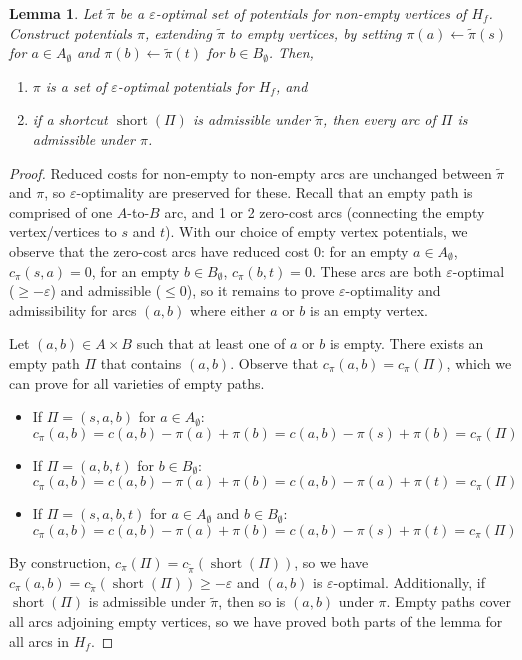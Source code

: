 \documentclass[11pt]{article}
\def\eps{\varepsilon}
\theoremstyle{plain}
\newtheorem{lemma}{Lemma}[section]
\numberwithin{figure}{section}
\def\short{\operatorname{short}}
\begin{document}
\begin{lemma}
\label{lemma:empty_correct}
Let $\tilde{\pi}$ be a $\eps$-optimal set of potentials for non-empty
vertices of $H_f$.
Construct potentials $\pi$, extending $\tilde{\pi}$ to empty vertices, by
setting $\pi(a) \gets \tilde{\pi}(s)$ for $a \in A_\emptyset$ and
$\pi(b) \gets \tilde{\pi}(t)$ for $b \in B_\emptyset$.
Then,
\begin{enumerate}
\item $\pi$ is a set of $\eps$-optimal potentials for $H_f$, and
\item if a shortcut $\short(\Pi)$ is admissible under $\tilde{\pi}$,
	then every arc of $\Pi$ is admissible under $\pi$.
\end{enumerate}
\end{lemma}

\begin{proof}
Reduced costs for non-empty to non-empty arcs are unchanged between
$\tilde{\pi}$ and $\pi$, so $\eps$-optimality are preserved for these.
Recall that an empty path is comprised of one $A$-to-$B$ arc, and 1 or 2
zero-cost arcs (connecting the empty vertex/vertices to $s$ and $t$).
With our choice of empty vertex potentials, we observe that the zero-cost arcs
have reduced cost 0:
for an empty $a \in A_\emptyset$, $c_\pi(s, a) = 0$, for an empty
$b \in B_\emptyset$, $c_\pi(b, t) = 0$.
These arcs are both $\eps$-optimal ($\geq -\eps$) and admissible ($\leq 0$), so
it remains to prove $\eps$-optimality and admissibility for arcs $(a, b)$ where
either $a$ or $b$ is an empty vertex.

Let $(a, b) \in A \times B$ such that at least one of $a$ or $b$ is empty.
There exists an empty path $\Pi$ that contains $(a, b)$.
Observe that $c_\pi(a, b) = c_\pi(\Pi)$,
which we can prove for all varieties of empty paths.
\begin{itemize}
\item If $\Pi = (s, a, b)$ for $a \in A_\emptyset$:
	\begin{equation*}
	c_\pi(a, b) = c(a, b) - \pi(a) + \pi(b) = c(a, b) - \pi(s) + \pi(b) = c_\pi(\Pi)
	\end{equation*}
\item If $\Pi = (a, b, t)$ for $b \in B_\emptyset$:
	\begin{equation*}
	c_\pi(a, b) = c(a, b) - \pi(a) + \pi(b) = c(a, b) - \pi(a) + \pi(t) = c_\pi(\Pi)
	\end{equation*}
\item If $\Pi = (s, a, b, t)$ for $a \in A_\emptyset$ and $b \in B_\emptyset$:
	\begin{equation*}
	c_\pi(a, b) = c(a, b) - \pi(a) + \pi(b) = c(a, b) - \pi(s) + \pi(t) = c_\pi(\Pi)
	\end{equation*}
\end{itemize}
By construction, $c_\pi(\Pi) = c_{\tilde{\pi}}(\short(\Pi))$, so we have
$c_\pi(a, b) = c_{\tilde{\pi}}(\short(\Pi)) \geq -\eps$ and $(a, b)$ is
$\eps$-optimal.
Additionally, if $\short(\Pi)$ is admissible under $\tilde{\pi}$, then so is
$(a, b)$ under $\pi$.
Empty paths cover all arcs adjoining empty vertices, so we have proved both
parts of the lemma for all arcs in $H_f$.
\end{proof}
\end{document}
